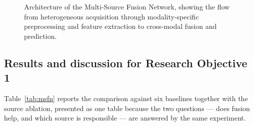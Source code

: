 \begin{figure}[!htb]
{}
\caption[Architecture of the Multi-Source Fusion Network]{Architecture of the Multi-Source
Fusion Network, showing the flow from heterogeneous acquisition through modality-specific
preprocessing and feature extraction to cross-modal fusion and prediction.}
\label{fig:msfn}
\end{figure}

\subsection{Results and discussion for Research Objective 1}

Table~\ref{tab:msfn} reports the comparison against six baselines together with the source
ablation, presented as one table because the two questions --- does fusion help, and which
source is responsible --- are answered by the same experiment.

